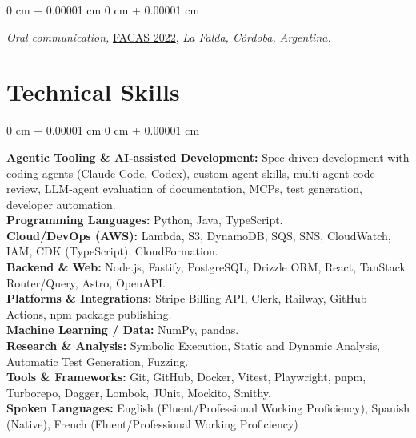 \documentclass[10pt, letterpaper]{article}
\newenvironment{onecolentry}{
    \begin{adjustwidth}{
        0 cm + 0.00001 cm
    }{
        0 cm + 0.00001 cm
    }
}{
    \end{adjustwidth}
} %
\begin{document}
    \vspace{0.1 cm}
    \begin{onecolentry}
        \textit{Oral communication,}
        \href{https://sites.google.com/view/facas2022/charlas-y-actividades-talks-and-activities?authuser=0}{\textsc{FACAS 2022}},
        \textit{La Falda, Córdoba, Argentina.}
    \end{onecolentry}





\vspace{0.1 cm}

\section{Technical Skills}

\vspace{0.1 cm}

\begin{onecolentry}
\textbf{Agentic Tooling \& AI-assisted Development:} Spec-driven development with coding agents (Claude Code, Codex), custom agent skills, multi-agent code review, LLM-agent evaluation of documentation, MCPs, test generation, developer automation. \\
\textbf{Programming Languages:} Python, Java, TypeScript. \\
\textbf{Cloud/DevOps (AWS):} Lambda, S3, DynamoDB, SQS, SNS, CloudWatch, IAM, CDK (TypeScript), CloudFormation. \\
\textbf{Backend \& Web:} Node.js, Fastify, PostgreSQL, Drizzle ORM, React, TanStack Router/Query, Astro, OpenAPI. \\
\textbf{Platforms \& Integrations:} Stripe Billing API, Clerk, Railway, GitHub Actions, npm package publishing. \\
\textbf{Machine Learning / Data:} NumPy, pandas. \\
\textbf{Research \& Analysis:} Symbolic Execution, Static and Dynamic Analysis, Automatic Test Generation, Fuzzing. \\
\textbf{Tools \& Frameworks:} Git, GitHub, Docker, Vitest, Playwright, pnpm, Turborepo, Dagger, Lombok, JUnit, Mockito, Smithy. \\
\textbf{Spoken Languages:} English (Fluent/Professional Working Proficiency), Spanish (Native), French (Fluent/Professional Working Proficiency)
\end{onecolentry}
\end{document}
